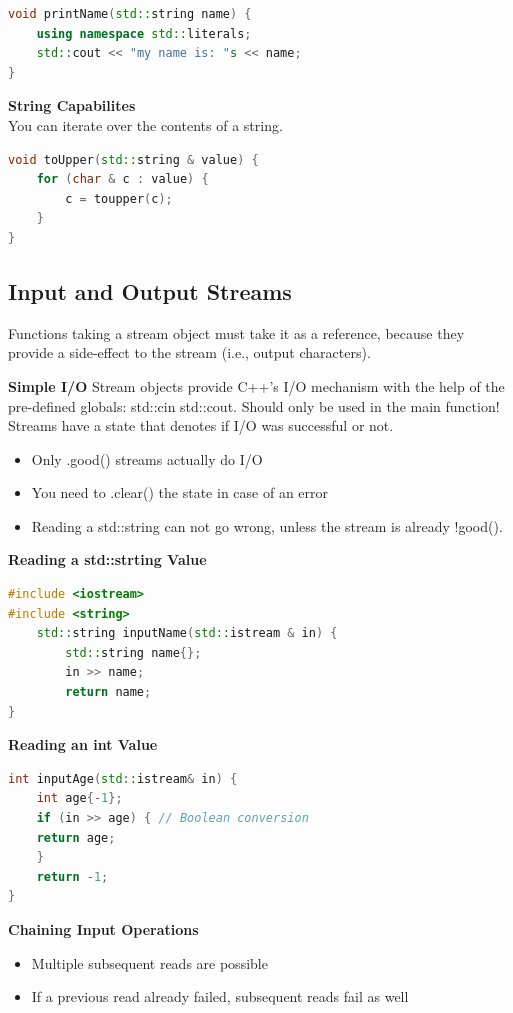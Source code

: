  \begin{lstlisting}[language=C++]
 void printName(std::string name) {
	using namespace std::literals;
	std::cout << "my name is: "s << name;
}	
\end{lstlisting}

\textbf{String Capabilites}\\
 You can iterate over the contents of a string.
\begin{lstlisting}[language=C++]
void toUpper(std::string & value) {
	for (char & c : value) {
		c = toupper(c); 
	}
}	
\end{lstlisting}

\subsection{Input and Output Streams}
Functions taking a stream object must take it as a reference, because they provide a side-effect to the stream (i.e., output characters).

\textbf{Simple I/O}
Stream objects provide C++'s I/O mechanism with the help of the pre-defined globals: std::cin std::cout. Should only be used in the main function! Streams have a state that denotes if I/O was successful or not.
\begin{itemize}
  \itemsep -0.5em 
  \item Only .good() streams actually do I/O
  \item You need to .clear() the state in case of an error
  \item Reading a std::string can not go wrong, unless the stream is already !good().
\end{itemize}

\textbf{Reading a std::strting Value }
\begin{lstlisting}[language=C++]
#include <iostream> 
#include <string>
	std::string inputName(std::istream & in) {
		std::string name{};
		in >> name;
		return name; 
}	
\end{lstlisting}
\textbf{Reading an int Value}
\begin{lstlisting}[language=C++]
int inputAge(std::istream& in) {
	int age{-1};
	if (in >> age) { // Boolean conversion
	return age; 
	} 
	return -1;
}
\end{lstlisting}
\textbf{Chaining Input Operations}
\begin{itemize}
  \itemsep -0.5em 
  \item Multiple subsequent reads are possible 
  \item If a previous read already failed, subsequent reads fail as well
\end{itemize}

